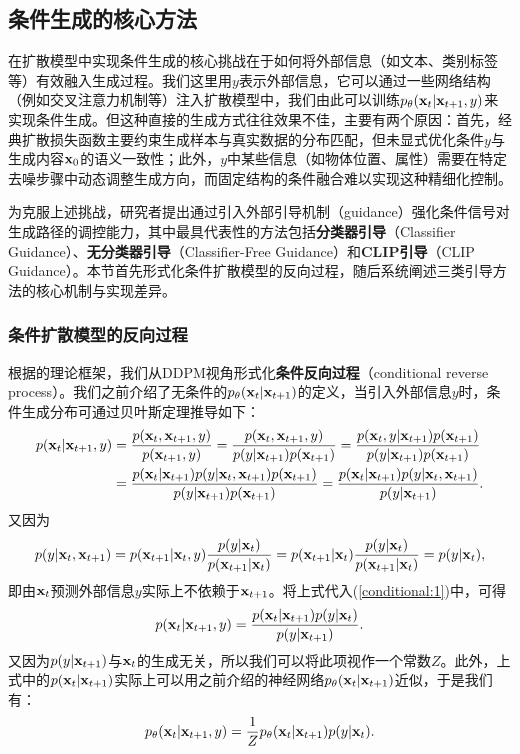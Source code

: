 \documentclass[11pt,a4paper,UTF8]{ctexart}
\begin{document}
\subsection{条件生成的核心方法}

在扩散模型中实现条件生成的核心挑战在于如何将外部信息（如文本、类别标签等）有效融入生成过程。我们这里用$y$表示外部信息，它可以通过一些网络结构（例如交叉注意力机制\cite{chen2021crossvit}等）注入扩散模型中，我们由此可以训练$p_{\theta}(\mathbf{x}_t|\mathbf{x}_{t+1},y)$来实现条件生成。但这种直接的生成方式往往效果不佳，主要有两个原因：首先，经典扩散损失函数主要约束生成样本与真实数据的分布匹配，但未显式优化条件$y$与生成内容$\mathbf{x}_0$的语义一致性；此外，$y$中某些信息（如物体位置、属性）需要在特定去噪步骤中动态调整生成方向，而固定结构的条件融合难以实现这种精细化控制\cite{saharia2022photorealistic}。

为克服上述挑战，研究者提出通过引入外部引导机制（guidance）强化条件信号对生成路径的调控能力，其中最具代表性的方法包括\textbf{分类器引导}（Classifier Guidance）、\textbf{无分类器引导}（Classifier-Free Guidance）和\textbf{CLIP引导}（CLIP Guidance）。本节首先形式化条件扩散模型的反向过程，随后系统阐述三类引导方法的核心机制与实现差异。

\subsubsection{条件扩散模型的反向过程}

根据\cite{dhariwal2021diffusion}的理论框架，我们从DDPM视角形式化\textbf{条件反向过程}（conditional reverse process）。我们之前介绍了无条件的$p_{\theta}(\mathbf{x}_{t}|\mathbf{x}_{t+1})$的定义，当引入外部信息$y$时，条件生成分布可通过贝叶斯定理推导如下：
\begin{align}
\begin{split}
    p(\mathbf{x}_{t}|\mathbf{x}_{t+1},y) &= \frac{p(\mathbf{x}_{t},\mathbf{x}_{t+1},y)}{p(\mathbf{x}_{t+1},y)} = \frac{p(\mathbf{x}_{t},\mathbf{x}_{t+1},y)}{p(y|\mathbf{x}_{t+1})p(\mathbf{x}_{t+1})} = \frac{p(\mathbf{x}_{t},y|\mathbf{x}_{t+1})p(\mathbf{x}_{t+1})}{p(y|\mathbf{x}_{t+1})p(\mathbf{x}_{t+1})} \\
    &= \frac{p(\mathbf{x}_{t}|\mathbf{x}_{t+1}) p(y|\mathbf{x}_{t},\mathbf{x}_{t+1})p(\mathbf{x}_{t+1})}{p(y|\mathbf{x}_{t+1})p(\mathbf{x}_{t+1})} = \frac{p(\mathbf{x}_{t}|\mathbf{x}_{t+1}) p(y|\mathbf{x}_{t},\mathbf{x}_{t+1})}{p(y|\mathbf{x}_{t+1})}.
\end{split}
\label{conditional:1}
\end{align}
又因为
\begin{equation*}
    p(y|\mathbf{x}_{t},\mathbf{x}_{t+1})=p(\mathbf{x}_{t+1}|\mathbf{x}_t,y)\frac{p(y|\mathbf{x}_t)}{p(\mathbf{x}_{t+1}|\mathbf{x}_t)} = p(\mathbf{x}_{t+1}|\mathbf{x}_t)\frac{p(y|\mathbf{x}_t)}{p(\mathbf{x}_{t+1}|\mathbf{x}_t)} = p(y|\mathbf{x}_t),
\end{equation*}
即由$\mathbf{x}_t$预测外部信息$y$实际上不依赖于$\mathbf{x}_{t+1}$。将上式代入(\ref{conditional:1})中，可得
\begin{equation*}
    p(\mathbf{x}_{t}|\mathbf{x}_{t+1},y) = \frac{p(\mathbf{x}_{t}|\mathbf{x}_{t+1})p(y|\mathbf{x}_t)}{p(y|\mathbf{x}_{t+1})}.
\end{equation*}
又因为$p(y|\mathbf{x}_{t+1})$与$\mathbf{x}_{t}$的生成无关，所以我们可以将此项视作一个常数$Z$。此外，上式中的$p(\mathbf{x}_{t}|\mathbf{x}_{t+1})$实际上可以用之前介绍的神经网络$p_\theta(\mathbf{x}_{t}|\mathbf{x}_{t+1})$近似，于是我们有：
\begin{equation}
    p_{\theta}(\mathbf{x}_{t}|\mathbf{x}_{t+1},y) = \frac{1}{Z} p_\theta(\mathbf{x}_{t}|\mathbf{x}_{t+1})p(y|\mathbf{x}_t).
\label{conditional:backward}  
\end{equation}
\end{document}
